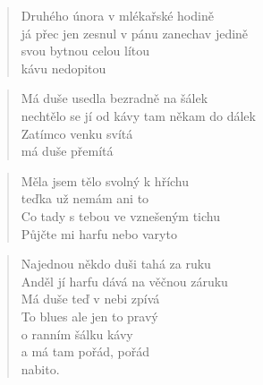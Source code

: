 \documentclass[12pt]{article}
\begin{document}
\begin{verse}
Druhého února v mlékařské hodině
\\ já přec jen zesnul v pánu zanechav jedině
\\ svou bytnou celou lítou 
\\ kávu nedopitou
\end{verse}

\begin{verse} 
Má duše usedla bezradně na šálek 
\\ nechtělo se jí od kávy tam někam do dálek
\\ Zatímco venku svítá
\\ má duše přemítá
\end{verse}

\begin{verse} 
Měla jsem tělo svolný k hříchu
\\ teďka už nemám ani to
\\ Co tady s tebou ve vznešeným tichu
\\ Půjčte mi harfu nebo varyto
\end{verse}

\begin{verse}
Najednou někdo duši tahá za ruku
\\ Anděl jí harfu dává na věčnou záruku
\\ Má duše teď v nebi zpívá
\\ To blues ale jen to pravý 
\\ o ranním šálku kávy
\\ a má tam pořád, pořád
\\ nabito.
\end{verse}

\end{document}
